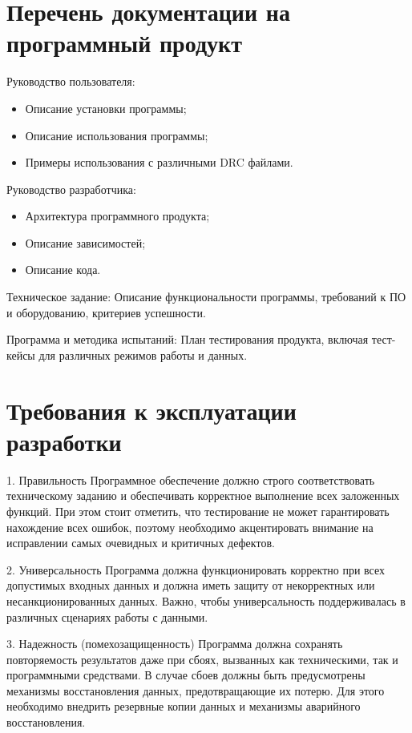 \section{Перечень документации на программный продукт}

Руководство пользователя:

\begin{itemize}
	\item Описание установки программы;
	\item Описание использования программы;
	\item Примеры использования с различными DRC файлами.
\end{itemize}

Руководство разработчика:

\begin{itemize}
	\item Архитектура программного продукта;
	\item Описание зависимостей;
	\item Описание кода.
\end{itemize}

Техническое задание:
Описание функциональности программы, требований к ПО
и оборудованию, критериев успешности.

Программа и методика испытаний:
План тестирования продукта,
включая тест-кейсы для различных режимов работы и данных.

\section{Требования к эксплуатации разработки}

1. Правильность
   Программное обеспечение должно строго соответствовать техническому заданию и обеспечивать корректное выполнение всех заложенных функций. При этом стоит отметить, что тестирование не может гарантировать нахождение всех ошибок, поэтому необходимо акцентировать внимание на исправлении самых очевидных и критичных дефектов.

2. Универсальность
   Программа должна функционировать корректно при всех допустимых входных данных и должна иметь защиту от некорректных или несанкционированных данных. Важно, чтобы универсальность поддерживалась в различных сценариях работы с данными.

3. Надежность (помехозащищенность)
   Программа должна сохранять повторяемость результатов даже при сбоях, вызванных как техническими, так и программными средствами. В случае сбоев должны быть предусмотрены механизмы восстановления данных, предотвращающие их потерю. Для этого необходимо внедрить резервные копии данных и механизмы аварийного восстановления.

